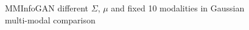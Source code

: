 \documentclass[letterpaper,12pt]{article}
\begin{document}
\begin{figure}[H]
    \hspace{10px}

    \caption{MMInfoGAN different $\Sigma$, $\mu$ and fixed 10 modalities in Gaussian multi-modal comparison}
\end{figure}
\end{document}

